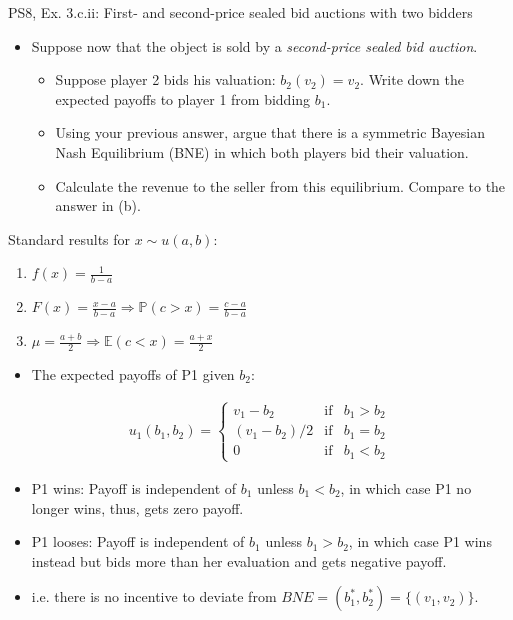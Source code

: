\begin{frame}{PS8, Ex. 3.c.ii: First- and second-price sealed bid auctions with two bidders}
    \begin{multicols}{2}
      \begin{itemize}
        \item[(c)] Suppose now that the object is sold by a \textit{second-price sealed bid auction}.
        \begin{itemize}\normalsize
          \item[i.]   Suppose player 2 bids his valuation: $b_2(v_2) = v_2$. Write down the expected payoffs to player 1 from bidding $b_1$.
          \item[ii.]  Using your previous answer, argue that there is a symmetric Bayesian Nash Equilibrium (BNE) in which both players bid their valuation.
          \item[iii.] Calculate the revenue to the seller from this equilibrium. Compare to the answer in (b).
        \end{itemize}
      \end{itemize}
      Standard results for $x\sim u(a, b):$
      \vspace{-6pt}
      \begin{enumerate}
        \item[PDF:] $f(x)=\frac{1}{b-a}$
        \item[CDF:] $F(x)=\frac{x-a}{b-a}\Rightarrow\mathbb{P}(c>x)=\frac{c-a}{b-a}$
        \item[Mean:] $\mu=\frac{a+b}{2}\Rightarrow\mathbb{E}(c<x)=\frac{a+x}{2}$
      \end{enumerate}
      \vfill\null\columnbreak
      \begin{itemize}
        \item[(i)] The expected payoffs of P1 given $b_2$:
      \end{itemize}
      \vspace{-12pt}
      \begin{align*}
        u_1(b_1,b_2)=\left\{\begin{array}{lcl}
          v_1-b_2     & \text{if} & b_1>b_2 \\
          (v_1-b_2)/2 & \text{if} & b_1=b_2 \\
          0           & \text{if} & b_1<b_2
        \end{array}\right.
      \end{align*}
      \vspace{-18pt}
      \begin{itemize}
        \item[(ii)] P1 wins: Payoff is independent of $b_1$ unless $b_1<b_2$, in which case P1 no longer wins, thus, gets zero payoff.
        \item[] P1 looses: Payoff is independent of $b_1$ unless $b_1>b_2$, in which case P1 wins instead but bids more than her evaluation and gets negative payoff.
        \item[] i.e. there is no incentive to deviate from $BNE=(b_1^*,b_2^*)=\{(v_1,v_2)\}$.
      \end{itemize}
      \vfill\null
    \end{multicols}
\end{frame}


